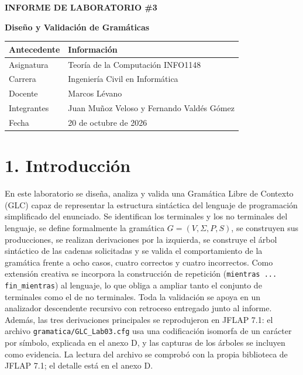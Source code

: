 \documentclass[11pt,letterpaper]{article}
\begin{document}

\begin{center}
  {\huge\bfseries INFORME DE LABORATORIO \#3\par}
  \vspace{0.2cm}
  {\Large\bfseries Diseño y Validación de Gramáticas\par}
  \vspace{0.55cm}
\end{center}

\begin{tabularx}{\textwidth}{|L{0.38\textwidth}|Y|}
\hline
{}\textbf{Antecedente} & \textbf{Información}\\\hline
Asignatura & Teoría de la Computación INFO1148\\\hline
Carrera & Ingeniería Civil en Informática\\\hline
Docente & Marcos Lévano\\\hline
Integrantes & Juan Muñoz Veloso y Fernando Valdés Gómez\\\hline
Fecha & 20 de octubre de 2026\\\hline
\end{tabularx}

\section*{1. Introducción}
En este laboratorio se diseña, analiza y valida una Gramática Libre de Contexto (GLC) capaz de
representar la estructura sintáctica del lenguaje de programación simplificado del enunciado. Se
identifican los terminales y los no terminales del lenguaje, se define formalmente la gramática
$G=(V,\Sigma,P,S)$, se construyen sus producciones, se realizan derivaciones por la izquierda, se
construye el árbol sintáctico de las cadenas solicitadas y se valida el comportamiento de la
gramática frente a ocho casos, cuatro correctos y cuatro incorrectos. Como extensión creativa se
incorpora la construcción de repetición (\texttt{mientras ... fin\_mientras}) al lenguaje, lo que
obliga a ampliar tanto el conjunto de terminales como el de no terminales. Toda la validación se
apoya en un analizador descendente recursivo con retroceso entregado junto al informe. Además, las
tres derivaciones principales se reprodujeron en JFLAP 7.1: el archivo
\texttt{gramatica/\allowbreak GLC\_Lab03.cfg} usa una codificación isomorfa de un carácter por
símbolo, explicada en el anexo D, y las capturas de los árboles se incluyen como evidencia. La
lectura del archivo se comprobó con la propia biblioteca de JFLAP 7.1; el detalle está en el
anexo D.
\end{document}
